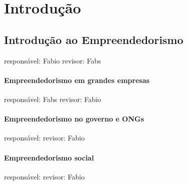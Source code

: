 \section{Introdução}

\subsection{Introdução ao Empreendedorismo}
responsável: Fabio revisor: Fabs

\paragraph{Empreendedorismo em grandes empresas}
responsável: Fabs revisor: Fabio

\paragraph{Empreendedorismo no governo e ONGs}
responsável: revisor: Fabio

\paragraph{Empreendedorismo social}
responsável: revisor: Fabio
